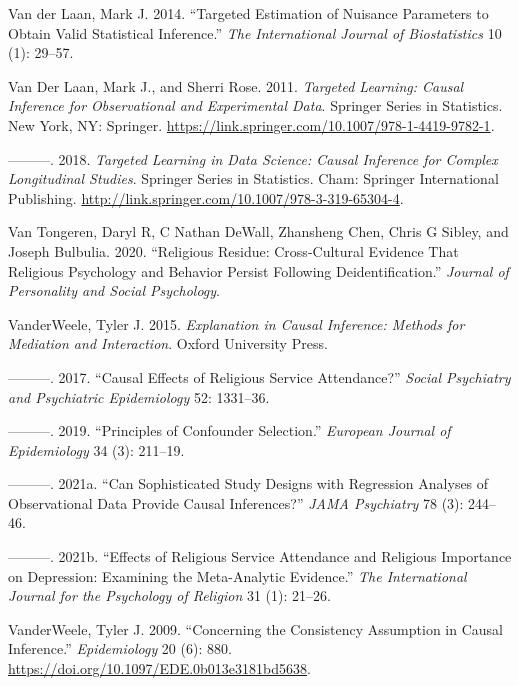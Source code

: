 \documentclass[
  single column]{article}
\newlength{\cslhangindent}
\newenvironment{CSLReferences}[2] %
 {\begin{list}{}{%
  \setlength{\itemindent}{0pt}
  \setlength{\leftmargin}{0pt}
  \setlength{\parsep}{0pt}
  \ifodd #1
   \setlength{\leftmargin}{\cslhangindent}
   \setlength{\itemindent}{-1\cslhangindent}
  \fi
  \setlength{\itemsep}{#2\baselineskip}}}
 {\end{list}}
\begin{document}
\begin{CSLReferences}{1}{0}
Van der Laan, Mark J. 2014. {``Targeted Estimation of Nuisance
Parameters to Obtain Valid Statistical Inference.''} \emph{The
International Journal of Biostatistics} 10 (1): 29--57.

Van Der Laan, Mark J., and Sherri Rose. 2011. \emph{Targeted Learning:
Causal Inference for Observational and Experimental Data}. Springer
Series in Statistics. New York, NY: Springer.
\url{https://link.springer.com/10.1007/978-1-4419-9782-1}.

---------. 2018. \emph{Targeted Learning in Data Science: Causal
Inference for Complex Longitudinal Studies}. Springer Series in
Statistics. Cham: Springer International Publishing.
\url{http://link.springer.com/10.1007/978-3-319-65304-4}.

Van Tongeren, Daryl R, C Nathan DeWall, Zhansheng Chen, Chris G Sibley,
and Joseph Bulbulia. 2020. {``Religious Residue: Cross-Cultural Evidence
That Religious Psychology and Behavior Persist Following
Deidentification.''} \emph{Journal of Personality and Social
Psychology}.

VanderWeele, Tyler J. 2015. \emph{Explanation in Causal Inference:
Methods for Mediation and Interaction}. Oxford University Press.

---------. 2017. {``Causal Effects of Religious Service Attendance?''}
\emph{Social Psychiatry and Psychiatric Epidemiology} 52: 1331--36.

---------. 2019. {``Principles of Confounder Selection.''}
\emph{European Journal of Epidemiology} 34 (3): 211--19.

---------. 2021a. {``Can Sophisticated Study Designs with Regression
Analyses of Observational Data Provide Causal Inferences?''} \emph{JAMA
Psychiatry} 78 (3): 244--46.

---------. 2021b. {``Effects of Religious Service Attendance and
Religious Importance on Depression: Examining the Meta-Analytic
Evidence.''} \emph{The International Journal for the Psychology of
Religion} 31 (1): 21--26.

VanderWeele, Tyler J. 2009. {``Concerning the Consistency Assumption in
Causal Inference.''} \emph{Epidemiology} 20 (6): 880.
\url{https://doi.org/10.1097/EDE.0b013e3181bd5638}.


\end{CSLReferences}
\end{document}
